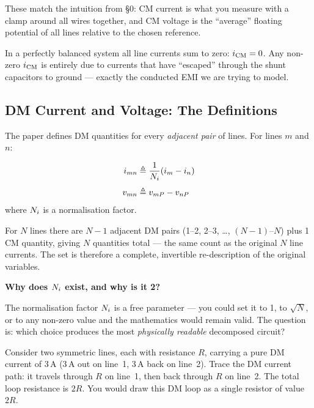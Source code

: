 These match the intuition from \S0: CM current is what you measure
with a clamp around all wires together, and CM voltage is the
``average'' floating potential of all lines relative to the chosen
reference.

\begin{warningbox}
In a perfectly balanced system all line currents sum to zero:
$i_{\mathrm{CM}} = 0$.  Any non-zero $i_{\mathrm{CM}}$ is entirely due to currents that
have ``escaped'' through the shunt capacitors to ground — exactly
the conducted EMI we are trying to model.
\end{warningbox}

\subsection{DM Current and Voltage: The Definitions}

The paper defines DM quantities for every \emph{adjacent pair} of
lines.  For lines $m$ and $n$:

\begin{eqnbox}
\begin{align}
    i_{mn} &\triangleq \frac{1}{N_{i}}(i_m - i_n)
            \label{eq:idm} \\[4pt]
    v_{mn} &\triangleq v_{mP} - v_{nP}
            \label{eq:vdm}
\end{align}
where $N_{i}$ is a normalisation factor.
\end{eqnbox}

For $N$ lines there are $N-1$ adjacent DM pairs
(1--2, 2--3, \ldots, $(N-1)$--$N$) plus 1 CM quantity, giving $N$
quantities total — the same count as the original $N$ line currents.
The set is therefore a complete, invertible re-description of the
original variables.

\textbf{Why does $N_{i}$ exist, and why is it 2?}

The normalisation factor $N_{i}$ is a free parameter — you could set it
to 1, to $\sqrt{N}$, or to any non-zero value and the mathematics
would remain valid.  The question is: which choice produces the most
\emph{physically readable} decomposed circuit?

Consider two symmetric lines, each with resistance $R$, carrying
a pure DM current of 3\,A (3\,A out on line~1, 3\,A back on line~2).
Trace the DM current path: it travels through $R$ on line~1, then
back through $R$ on line~2.  The total loop resistance is $2R$.
You would draw this DM loop as a single resistor of value $2R$.

